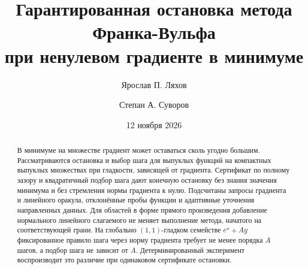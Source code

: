 \documentclass[a4paper,11pt]{article}
\title{Гарантированная остановка метода Франка-Вульфа\\при ненулевом градиенте в минимуме}
\author{Ярослав П. Ляхов \and Степан А. Суворов}
\date{12 ноября 2026}
\begin{document}
\maketitle
\begin{abstract}
В минимуме на множестве градиент может оставаться сколь угодно большим.
Рассматриваются остановка и выбор шага для выпуклых функций на компактных
выпуклых множествах при гладкости, зависящей от градиента. Сертификат
по полному зазору и квадратичный подбор шага дают конечную остановку
без знания значения минимума и без стремления нормы градиента к нулю.
Подсчитаны запросы градиента и линейного оракула, отклонённые пробы
функции и адаптивные уточнения направленных данных. Для областей в
форме прямого произведения добавление нормального линейного слагаемого
не меняет выполнение метода, начатого на соответствующей грани.
На глобально $(1,1)$-гладком семействе $e^x+Ay$ фиксированное правило шага
через норму градиента требует не менее порядка $A$ шагов, а подбор шага
не зависит от $A$. Детерминированный эксперимент воспроизводит это
различие при одинаковом сертификате остановки.
\end{abstract}






\end{document}
